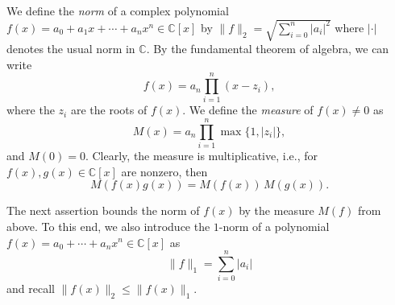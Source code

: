 We define the \emph{norm} of a complex polynomial  $f(x) = a_0+a_1x+ \cdots+a_nx^n ∈ ℂ[x]$ by  $\|f\|_2 = \sqrt{∑_{i=0}^n |a_i|^2}$ where $|⋅|$ denotes the usual norm in $ℂ$. By the fundamental theorem of algebra, we can write
\begin{displaymath}
f(x)  = a_n ∏_{i=1}^n (x-z_i),  
\end{displaymath}
where the $z_i$ are the roots of $f(x)$. We define the \emph{measure} of $f(x)≠0$ as
\begin{displaymath}
  M(x) = a_n ∏_{i=1}^n \max\{1,|z_i|\},
\end{displaymath}
and $M(0) = 0$. 
Clearly, the measure is multiplicative, i.e., for $f(x),g(x) ∈ℂ[x]$ are nonzero, then
\begin{displaymath}
  M(f(x)g(x)) = M(f(x)) \, M (g(x)). 
\end{displaymath}


The next assertion bounds the norm of $f(x)$ by the measure $M(f)$ from above. To this end, we also introduce the $1$-norm of a polynomial $f(x) = a_0+ \cdots+a_nx^n∈ ℂ[x]$ as
\begin{displaymath}
  \|f\|_1 = ∑_{i=0}^n |a_i| 
\end{displaymath}
and recall $\|f(x)\|_2 ≤ \|f(x)\|_1$. 

